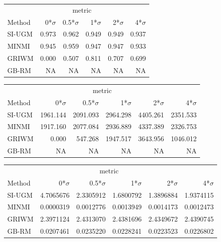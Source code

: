 \documentclass[
]{article}
\begin{document}
\begin{tabular}{lrrrrr}
\toprule
\multicolumn{1}{c}{ } & \multicolumn{4}{c}{metric} \\
\cmidrule(l{3pt}r{3pt}){2-5}
Method & 0*$\sigma$ & 0.5*$\sigma$ & 1*$\sigma$ & 2*$\sigma$ & 4*$\sigma$\\
\midrule
SI-UGM & 0.973 & 0.962 & 0.949 & 0.949 & 0.937\\
MINMI & 0.945 & 0.959 & 0.947 & 0.947 & 0.933\\
GRIWM & 0.000 & 0.507 & 0.811 & 0.707 & 0.699\\
GB-RM & NA & NA & NA & NA & NA\\
\bottomrule
\end{tabular}

\begin{tabular}{lrrrrr}
\toprule
\multicolumn{1}{c}{ } & \multicolumn{4}{c}{metric} \\
\cmidrule(l{3pt}r{3pt}){2-5}
Method & 0*$\sigma$ & 0.5*$\sigma$ & 1*$\sigma$ & 2*$\sigma$ & 4*$\sigma$\\
\midrule
SI-UGM & 1961.144 & 2091.093 & 2964.298 & 4405.261 & 2351.533\\
MINMI & 1917.160 & 2077.084 & 2936.889 & 4337.389 & 2326.753\\
GRIWM & 0.000 & 547.268 & 1947.517 & 3643.956 & 1046.012\\
GB-RM & NA & NA & NA & NA & NA\\
\bottomrule
\end{tabular}

\begin{tabular}{lrrrrr}
\toprule
\multicolumn{1}{c}{ } & \multicolumn{4}{c}{metric} \\
\cmidrule(l{3pt}r{3pt}){2-5}
Method & 0*$\sigma$ & 0.5*$\sigma$ & 1*$\sigma$ & 2*$\sigma$ & 4*$\sigma$\\
\midrule
SI-UGM & 4.7065676 & 2.3305912 & 1.6800792 & 1.3896884 & 1.9374115\\
MINMI & 0.0000319 & 0.0012776 & 0.0013949 & 0.0014173 & 0.0012473\\
GRIWM & 2.3971124 & 2.4313070 & 2.4381696 & 2.4349672 & 2.4390745\\
GB-RM & 0.0207461 & 0.0235220 & 0.0228241 & 0.0223523 & 0.0226802\\
\bottomrule
\end{tabular}
\end{document}
